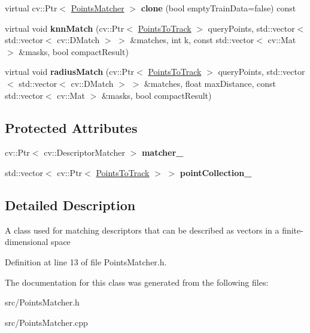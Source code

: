 \begin{DoxyCompactItemize}
\item 
\hypertarget{class_opencv_sf_m_1_1_points_matcher_a340a5cfae0d6cb8cb68f1fa77ec89993}{
virtual cv::Ptr$<$ \hyperlink{class_opencv_sf_m_1_1_points_matcher}{PointsMatcher} $>$ {\bfseries clone} (bool emptyTrainData=false) const }
\label{class_opencv_sf_m_1_1_points_matcher_a340a5cfae0d6cb8cb68f1fa77ec89993}

\item 
\hypertarget{class_opencv_sf_m_1_1_points_matcher_a922a829860b62c362b9de2344add8ec3}{
virtual void {\bfseries knnMatch} (cv::Ptr$<$ \hyperlink{class_opencv_sf_m_1_1_points_to_track}{PointsToTrack} $>$ queryPoints, std::vector$<$ std::vector$<$ cv::DMatch $>$ $>$ \&matches, int k, const std::vector$<$ cv::Mat $>$ \&masks, bool compactResult)}
\label{class_opencv_sf_m_1_1_points_matcher_a922a829860b62c362b9de2344add8ec3}

\item 
\hypertarget{class_opencv_sf_m_1_1_points_matcher_a5ad04594beba392a9939a1f8bcaaf5a2}{
virtual void {\bfseries radiusMatch} (cv::Ptr$<$ \hyperlink{class_opencv_sf_m_1_1_points_to_track}{PointsToTrack} $>$ queryPoints, std::vector$<$ std::vector$<$ cv::DMatch $>$ $>$ \&matches, float maxDistance, const std::vector$<$ cv::Mat $>$ \&masks, bool compactResult)}
\label{class_opencv_sf_m_1_1_points_matcher_a5ad04594beba392a9939a1f8bcaaf5a2}

\end{DoxyCompactItemize}
\subsection*{Protected Attributes}
\begin{DoxyCompactItemize}
\item 
\hypertarget{class_opencv_sf_m_1_1_points_matcher_a652ba26d167b0ab2dc27e8087ab8d3cf}{
cv::Ptr$<$ cv::DescriptorMatcher $>$ {\bfseries matcher\_\-}}
\label{class_opencv_sf_m_1_1_points_matcher_a652ba26d167b0ab2dc27e8087ab8d3cf}

\item 
\hypertarget{class_opencv_sf_m_1_1_points_matcher_ac6a1f04e34a72f8479814bf4eef9dfb1}{
std::vector$<$ cv::Ptr$<$ \hyperlink{class_opencv_sf_m_1_1_points_to_track}{PointsToTrack} $>$ $>$ {\bfseries pointCollection\_\-}}
\label{class_opencv_sf_m_1_1_points_matcher_ac6a1f04e34a72f8479814bf4eef9dfb1}

\end{DoxyCompactItemize}


\subsection{Detailed Description}
A class used for matching descriptors that can be described as vectors in a finite-\/dimensional space 

Definition at line 13 of file PointsMatcher.h.



The documentation for this class was generated from the following files:\begin{DoxyCompactItemize}
\item 
src/PointsMatcher.h\item 
src/PointsMatcher.cpp\end{DoxyCompactItemize}
